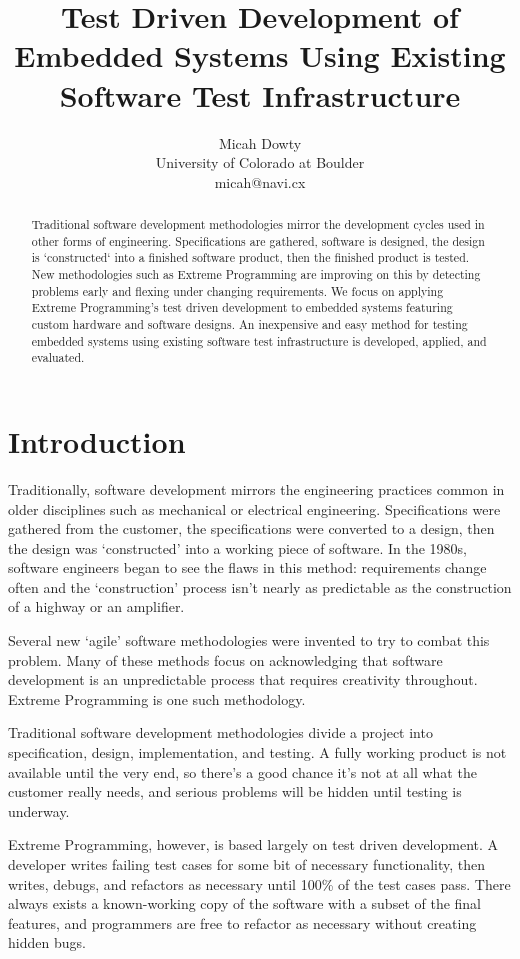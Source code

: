 \documentclass[letterpaper,twocolumn]{article}
\title{Test Driven Development of Embedded Systems Using Existing Software Test Infrastructure}
\author{Micah Dowty \\ University of Colorado at Boulder \\ micah@navi.cx}
\begin{document}
\maketitle
\begin{abstract}
Traditional software development methodologies mirror the development cycles used in other
forms of engineering. Specifications are gathered, software is designed, the design is
`constructed` into a finished software product, then the finished product is tested.
New methodologies such as Extreme Programming are improving on this by detecting problems
early and flexing under changing requirements. We focus on applying Extreme
Programming's test driven development to embedded systems featuring custom hardware and
software designs. An inexpensive and easy method for testing embedded systems using existing
software test infrastructure is developed, applied, and evaluated.
\end{abstract}

\section{Introduction}

Traditionally, software development mirrors the engineering practices common in older
disciplines such as mechanical or electrical engineering. Specifications were gathered
from the customer, the specifications were converted to a design, then the design was
`constructed' into a working piece of software. In the 1980s, software engineers began
to see the flaws in this method: requirements change often and the `construction' process
isn't nearly as predictable as the construction of a highway or an amplifier.

Several new `agile' software methodologies were invented to try to combat this problem.
Many of these methods focus on acknowledging that software development is an unpredictable
process that requires creativity throughout. Extreme Programming is one such methodology.

Traditional software development methodologies divide a project into specification, design, implementation,
and testing. A fully working product is not available until the very end, so there's a good
chance it's not at all what the customer really needs, and serious problems will be hidden
until testing is underway.

Extreme Programming, however, is based largely on test driven development. A developer
writes failing test cases for some bit of necessary functionality, then writes, debugs,
and refactors as necessary until 100\%
of the test cases pass. There always exists a known-working copy of the software with a subset
of the final features, and programmers are free to refactor as necessary without creating
hidden bugs.
\end{document}
